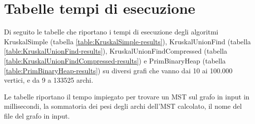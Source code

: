 \appendix
\section{Tabelle tempi di esecuzione}
\label{cap:runtime-tables}

Di seguito le tabelle che riportano i tempi di esecuzione degli algoritmi KruskalSimple (tabella \ref{table:KruskalSimple-results}), KruskalUnionFind (tabella \ref{table:KruskalUnionFind-results}), KruskalUnionFindCompressed  (tabella \ref{table:KruskalUnionFindCompressed-results}) e PrimBinaryHeap (tabella \ref{table:PrimBinaryHeap-results}) su diversi grafi che vanno dai 10 ai 100.000 vertici, e da 9 a 133525 archi.

Le tabelle riportano il tempo impiegato per trovare un MST sul grafo in input in millisecondi, la sommatoria dei pesi degli archi dell'MST calcolato, il nome del file del grafo in input.

